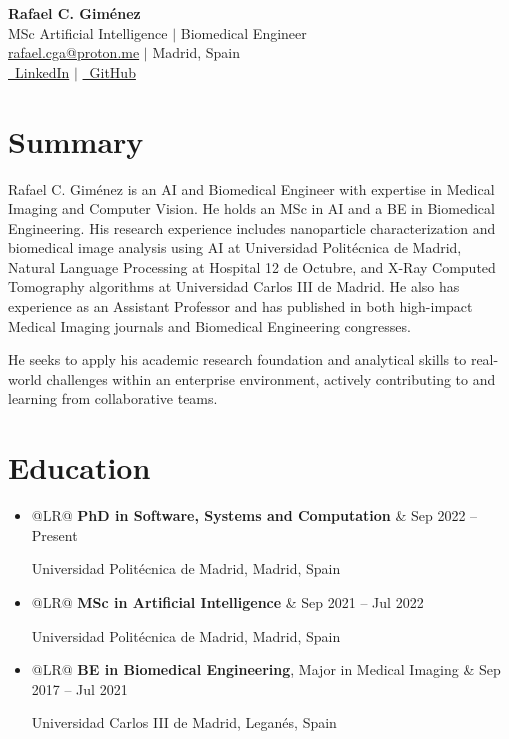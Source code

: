 \documentclass[letterpaper,10pt]{article}
\makeatletter
\newcommand{\dateitem}[2]{
    \item
    \noindent
    \begin{tabularx}{\linewidth}{@{}LR@{}}
        #1 & #2 \\
    \end{tabularx}
    \par
}
\makeatother
\begin{document}
\begin{center}
    \vspace{-1cm} %
    \color{headerblue}
    {\Huge \bfseries Rafael C. Giménez} \\
    \vspace{5pt}
    \normalsize
    MSc Artificial Intelligence $|$ Biomedical Engineer \\
    \vspace{5pt}
    \color{textgray}
    \href{mailto:rafael.cga@proton.me}{rafael.cga@proton.me} $|$ Madrid, Spain \\
    \vspace{3pt}
    \href{https://www.linkedin.com/in/rafaelcga/}{\faLinkedin\ LinkedIn} $|$ \href{https://github.com/rafaelcga}{\faGithub\ GitHub} \\
\end{center}
\vspace{5pt} %

\section*{Summary}
\vspace{5pt}
\color{textgray}
Rafael C. Giménez is an AI and Biomedical Engineer with expertise in Medical Imaging and Computer Vision. He holds an MSc in AI and a BE in Biomedical Engineering. His research experience includes nanoparticle characterization and biomedical image analysis using AI at Universidad Politécnica de Madrid, Natural Language Processing at Hospital 12 de Octubre, and X-Ray Computed Tomography algorithms at Universidad Carlos III de Madrid. He also has experience as an Assistant Professor and has published in both high-impact Medical Imaging journals and Biomedical Engineering congresses.

He seeks to apply his academic research foundation and analytical skills to real-world challenges within an enterprise environment, actively contributing to and learning from collaborative teams.

\section*{Education}
\vspace{5pt}
\color{textgray}
\begin{itemize}
    \dateitem{\textbf{PhD in Software, Systems and Computation}}{Sep 2022 -- Present}
        Universidad Politécnica de Madrid, Madrid, Spain
    \dateitem{\textbf{MSc in Artificial Intelligence}}{Sep 2021 -- Jul 2022}
        Universidad Politécnica de Madrid, Madrid, Spain
    \dateitem{\textbf{BE in Biomedical Engineering}, Major in Medical Imaging}{Sep 2017 -- Jul 2021}
        Universidad Carlos III de Madrid, Leganés, Spain
\end{itemize}
\end{document}
